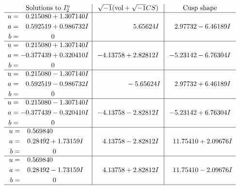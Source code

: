 \documentclass[1p]{elsarticle_modified}
\theoremstyle{definition}
\newcommand{\I}{\sqrt{-1}}
\begin{document}
$$\begin{array}{c|c|c}  
\text{Solutions to }I^u_{2}& \I (\text{vol} + \sqrt{-1}CS) & \text{Cusp shape}\\
 \hline 
\begin{aligned}
u &= \phantom{-}0.215080 + 1.307140 I \\
a &= \phantom{-}0.592519 + 0.986732 I \\
b &= \phantom{-0.000000 } 0\end{aligned}
 & \phantom{-0.000000 -}5.65624 I & \phantom{-}2.97732 - 6.46189 I \\ \hline\begin{aligned}
u &= \phantom{-}0.215080 + 1.307140 I \\
a &= -0.377439 + 0.320410 I \\
b &= \phantom{-0.000000 } 0\end{aligned}
 & -4.13758 + 2.82812 I & -5.23142 - 6.76304 I \\ \hline\begin{aligned}
u &= \phantom{-}0.215080 - 1.307140 I \\
a &= \phantom{-}0.592519 - 0.986732 I \\
b &= \phantom{-0.000000 } 0\end{aligned}
 & \phantom{-0.000000 } -5.65624 I & \phantom{-}2.97732 + 6.46189 I \\ \hline\begin{aligned}
u &= \phantom{-}0.215080 - 1.307140 I \\
a &= -0.377439 - 0.320410 I \\
b &= \phantom{-0.000000 } 0\end{aligned}
 & -4.13758 - 2.82812 I & -5.23142 + 6.76304 I \\ \hline\begin{aligned}
u &= \phantom{-}0.569840\phantom{ +0.000000I} \\
a &= \phantom{-}0.28492 + 1.73159 I \\
b &= \phantom{-0.000000 } 0\end{aligned}
 & \phantom{-}4.13758 - 2.82812 I & \phantom{-}11.75410 + 2.09676 I \\ \hline\begin{aligned}
u &= \phantom{-}0.569840\phantom{ +0.000000I} \\
a &= \phantom{-}0.28492 - 1.73159 I \\
b &= \phantom{-0.000000 } 0\end{aligned}
 & \phantom{-}4.13758 + 2.82812 I & \phantom{-}11.75410 - 2.09676 I\\
 \hline 
 \end{array}$$\newpage\newpage\renewcommand{\arraystretch}{1}
\end{document}
